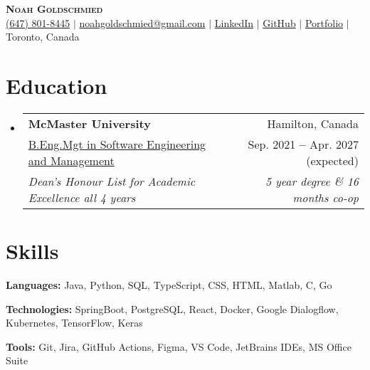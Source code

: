 \documentclass[letterpaper,10pt]{article}
\makeatletter
\newcommand{\resumeEducationHeading}[6]{
  \vspace{-2pt}\item
    \begin{tabular*}{0.97\textwidth}[t]{l@{\extracolsep{\fill}}r}
      \textbf{#1} & #2 \\
      {\small#3} & {\small #4} \\
      \textit{\small#5} & \textit{\small #6} \\
    \end{tabular*}\vspace{-5pt}
}
\newcommand{\resumeSubHeadingListStart}{\begin{itemize}[leftmargin=0.15in, label={}]}
\newcommand{\resumeSubHeadingListEnd}{\end{itemize}}
\makeatother
\begin{document}

\begin{center}
    \textbf{\Huge \scshape Noah Goldschmied} \\ \vspace{1pt}
    \small
    \faPhone \hspace{.5pt} \href{tel:+16478018445}{(647) 801-8445}
    $|$
    \faEnvelope \hspace{.5pt} \href{mailto:noahgoldschmied@gmail.com}{noahgoldschmied@gmail.com}
    $|$
    \faLinkedinSquare \hspace{.5pt} \href{https://www.linkedin.com/in/noah-goldschmied}{LinkedIn}
    $|$
    \faGithub \hspace{.5pt} \href{https://github.com/noahgoldschmied}{GitHub}
    $|$
    \faGlobe \hspace{.5pt} \href{https://noahgoldschmied.com}{Portfolio}
    $|$
    \faMapMarker \hspace{.5pt} {Toronto, Canada}
\end{center}




\section{Education}
  \vspace{3pt}
  \resumeSubHeadingListStart
    
    \resumeEducationHeading
      {McMaster University}{Hamilton, Canada}
      {\href{https://www.eng.mcmaster.ca/cas/degree-options/software-engineering-and-management/}{B.Eng.Mgt in Software Engineering and Management}}{Sep. 2021 \textbf{--} Apr. 2027 (expected)}
      {Dean's Honour List for Academic Excellence all 4 years}{5 year degree \& 16 months co-op}
  \resumeSubHeadingListEnd


\section{Skills}
  \vspace{2pt}
  \resumeSubHeadingListStart
    \small{\item{
        
        \textbf{Languages:}{ Java, Python, SQL, TypeScript, CSS, HTML, Matlab, C, Go} \\ \vspace{3pt}

        \textbf{Technologies:}{ SpringBoot, PostgreSQL, React, Docker, Google Dialogflow, Kubernetes, TensorFlow, Keras } \\ \vspace{3pt}

        \textbf{Tools:}{ Git, Jira, GitHub Actions, Figma, VS Code, JetBrains IDEs, MS Office Suite} \\ \vspace{3pt}
        
    }}
  \resumeSubHeadingListEnd
\end{document}
